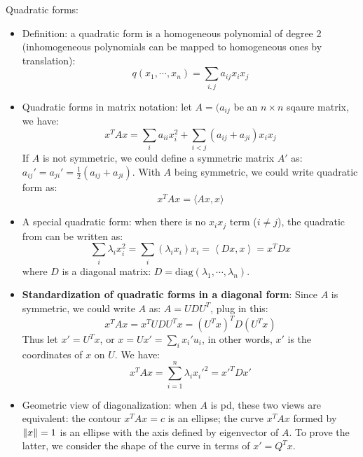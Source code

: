 \documentclass{report}
\begin{document}
Quadratic forms: 
\begin{itemize}
	\item Definition: a quadratic form is a homogeneous polynomial of degree 2 (inhomogeneous polynomials can be mapped to homogeneous ones by translation): 
\begin{equation}
q(x_1, \cdots, x_n) = \sum_{i,j} a_{ij} x_i x_j	
\end{equation}

	\item Quadratic forms in matrix notation: let $A = (a_{ij}$ be an $n \times n$ sqaure matrix, we have: 
\begin{equation}
x^T A x = \sum_i a_{ii} x_i^2 + \sum_{i<j} (a_{ij} + a_{ji}) x_i x_j	
\end{equation}
If $A$ is not symmetric, we could define a symmetric matrix $A'$ as: $a_{ij}' = a_{ji}' = \frac{1}{2} (a_{ij} + a_{ji})$. With $A$ being symmetric, we could write quadratic form as: 
\begin{equation}
x^T A x = \langle Ax, x \rangle 
\end{equation}

\item A special quadratic form: when there is no $x_i x_j$ term ($i \neq j$), the quadratic from can be written as: 
\begin{equation}
\sum_i \lambda_i x_i^2 = \sum_i (\lambda_i x_i) x_i = \left< Dx, x \right> = x^T D x
\end{equation}
where $D$ is a diagonal matrix: $D = \text{diag} (\lambda_1, \cdots, \lambda_n)$. 

\item \textbf{Standardization of quadratic forms in a diagonal form}: Since $A$ is symmetric, we could write $A$ as: $A = U D U^T$, plug in this: 
\begin{equation}
x^T A x = x^T U D U^T x = (U^T x)^T D (U^T x)
\end{equation}
Thus let $x' = U^T x$, or $x = U x' = \sum_i x_i' u_i$, in other words, $x'$ is the coordinates of $x$ on $U$. We have: 
\begin{equation}
x^T A x = \sum_{i=1}^n \lambda_i x_i'^2	= x'^T D x'
\end{equation}

\item Geometric view of diagonalization: when $A$ is pd, these two views are equivalent: the contour $x^T A x = c$ is an ellipse; the curve $x^T A x$ formed by $\lVert x\rVert = 1$ is an ellipse with the axis defined by eigenvector of $A$. To prove the latter, we consider the shape of the curve in terms of $x' = Q^T x$.   


\end{itemize}
\end{document}
